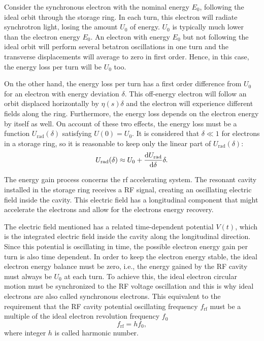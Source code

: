 Consider the synchronous electron with the nominal energy $E_0$, following the ideal orbit through the storage ring. In each turn, this electron will radiate synchrotron light, losing the amount $U_0$ of energy. $U_0$ is typically much lower than the electron energy $E_0$. An electron with energy $E_0$ but not following the ideal orbit will perform several betatron oscillations in one turn and the transverse displacements will average to zero in first order. Hence, in this case, the energy loss per turn will be $U_0$ too. 

On the other hand, the energy loss per turn has a first order difference from $U_0$ for an electron with energy deviation $\delta$. This off-energy electron will follow an orbit displaced horizontally by $\eta(s)\delta$ and the electron will experience different fields along the ring. Furthermore, the energy loss depends on the electron energy by itself as well. On account of these two effects, the energy loss must be a function $U_{\mathrm{rad}}(\delta)$ satisfying $U(0) = U_0$. It is considered that $\delta \ll 1$ for electrons in a storage ring, so it is reasonable to keep only the linear part of $U_{\mathrm{rad}}(\delta)$:
\begin{equation}
    U_{\mathrm{rad}}(\delta) \approx U_0 + \dfrac{\mathrm{d} U_{\mathrm{rad}}}{\mathrm{d} \delta}\delta.
    \label{approx1}
\end{equation}

The energy gain process concerns the \gls{rf} accelerating system. The resonant cavity installed in the storage ring receives a RF signal, creating an oscillating electric field inside the cavity. This electric field has a longitudinal component that might accelerate the electrons and allow for the electrons energy recovery.

The electric field mentioned has a related time-dependent potential $V(t)$, which is the integrated electric field inside the cavity along the longitudinal direction. Since this potential is oscillating in time, the possible electron energy gain per turn is also time dependent. In order to keep the electron energy stable, the ideal electron energy balance must be zero, i.e., the energy gained by the RF cavity must always be $U_0$ at each turn. To achieve this, the ideal electron circular motion must be synchronized to the RF voltage oscillation and this is why ideal electrons are also called synchronous electrons. This equivalent to the requirement that the RF cavity potential oscillating frequency $f_{\mathrm{rf}}$ must be a multiple of the ideal electron revolution frequency $f_0$
\begin{equation}
    f_{\mathrm{rf}} = h f_0,
\end{equation}
where integer $h$ is called harmonic number.

